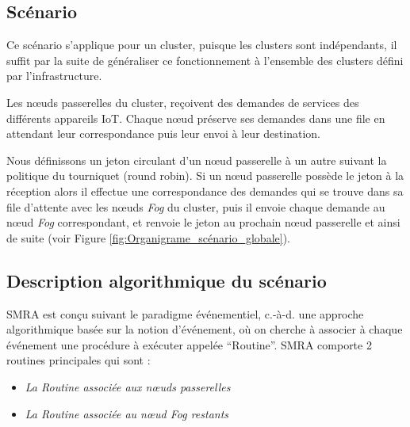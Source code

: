 \subsection{Scénario}
Ce scénario s'applique pour un cluster, puisque les clusters sont indépendants, il suffit par la suite de généraliser ce fonctionnement à l'ensemble des clusters défini par l'infrastructure.\par
Les nœuds passerelles du cluster, reçoivent des demandes de services des différents appareils IoT. Chaque nœud préserve ses demandes dans une file en attendant leur correspondance puis leur envoi à leur destination.\par
Nous définissons un jeton circulant d'un nœud passerelle à un autre suivant la politique du tourniquet (round robin). Si un nœud passerelle possède le jeton à la réception alors il effectue une correspondance des demandes qui se trouve dans sa file d'attente avec les nœuds \emph{Fog} du cluster, puis il envoie chaque demande au nœud \emph{Fog} correspondant, et  renvoie le jeton au prochain nœud passerelle et ainsi de suite (voir Figure \ref{fig:Organigrame_scénario_globale}).

\subsection{Description algorithmique du scénario}
SMRA est conçu suivant le paradigme événementiel, c.-à-d. une approche algorithmique basée sur la notion d'événement, où on cherche à associer à chaque événement une procédure à exécuter appelée “Routine”.   
SMRA comporte 2 routines principales qui sont :
\begin{itemize}
    \item \emph{La Routine associée aux nœuds passerelles}
    \item \emph{La Routine associée au nœud Fog restants}
\end{itemize}

